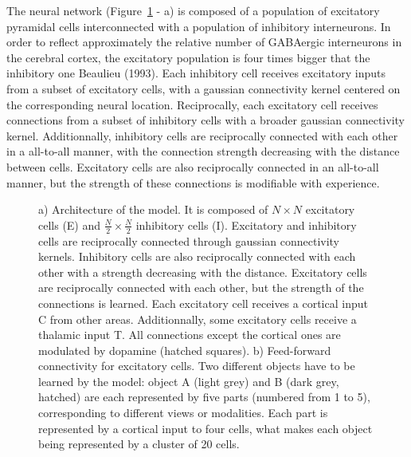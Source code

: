 \documentclass[
  11pt,
  a4paper,
]{scrbook}
\begin{document}
The neural network (Figure~\ref{fig-jocn:model} - a) is composed of a
population of excitatory pyramidal cells interconnected with a
population of inhibitory interneurons. In order to reflect approximately
the relative number of GABAergic interneurons in the cerebral cortex,
the excitatory population is four times bigger that the inhibitory one
Beaulieu (1993). Each inhibitory cell receives excitatory inputs from a
subset of excitatory cells, with a gaussian connectivity kernel centered
on the corresponding neural location. Reciprocally, each excitatory cell
receives connections from a subset of inhibitory cells with a broader
gaussian connectivity kernel. Additionnally, inhibitory cells are
reciprocally connected with each other in a all-to-all manner, with the
connection strength decreasing with the distance between cells.
Excitatory cells are also reciprocally connected in an all-to-all
manner, but the strength of these connections is modifiable with
experience.

\begin{figure}


\caption{\label{fig-jocn:model}a) Architecture of the model. It is
composed of \(N \times N\) excitatory cells (E) and
\(\frac{N}{2} \times \frac{N}{2}\) inhibitory cells (I). Excitatory and
inhibitory cells are reciprocally connected through gaussian
connectivity kernels. Inhibitory cells are also reciprocally connected
with each other with a strength decreasing with the distance. Excitatory
cells are reciprocally connected with each other, but the strength of
the connections is learned. Each excitatory cell receives a cortical
input C from other areas. Additionnally, some excitatory cells receive a
thalamic input T. All connections except the cortical ones are modulated
by dopamine (hatched squares). b) Feed-forward connectivity for
excitatory cells. Two different objects have to be learned by the model:
object A (light grey) and B (dark grey, hatched) are each represented by
five parts (numbered from 1 to 5), corresponding to different views or
modalities. Each part is represented by a cortical input to four cells,
what makes each object being represented by a cluster of 20 cells.}

\end{figure}%
\end{document}
